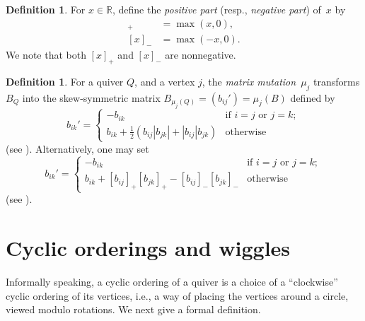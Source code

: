 \documentclass[11pt, letterpaper]{amsart}
\theoremstyle{definition}
\newtheorem{definition}[theorem]{Definition}
\numberwithin{equation}{section}
\def\RR{{\mathbb R}}
\begin{document}
\begin{definition}
For $x\in\RR$, define the \emph{positive part} (resp., \emph{negative part}) of~$x$ by 
\begin{align*}
[x]_+ &= \max(x,0), \\
[x]_- &= \max(-x,0). 
\end{align*}
We note that both $[x]_+$ and $[x]_-$ are nonnegative.  
\end{definition}

\begin{definition}
\label{def:matrix-mut}
For a quiver $Q$, and a vertex $j$, the \emph{matrix mutation}~$\mu_j$ transforms $B_Q$ into the skew-symmetric matrix $B_{\mu_j(Q)}=(b_{ij}')=\mu_j(B)$ defined by
\begin{equation}
b_{ik}'=\begin{cases}
-b_{ik} & \text{if $i=j$ or $j=k$}; \\
b_{ik}+\frac12 (b_{ij}|b_{jk}|+|b_{ij}|b_{jk}) & \text{otherwise}
\end{cases}
\end{equation}
(see \cite[(4.3)]{ca1}). 
Alternatively, one may set 
\begin{equation}
\label{eq: def mutation signs}
b_{ik}'=\begin{cases}
-b_{ik} & \text{if $i=j$ or $j=k$}; \\
b_{ik}+ [b_{ij}]_+[b_{jk}]_+ - [b_{ij}]_-[b_{jk}]_- & \text{otherwise}
\end{cases}
\end{equation}
(see \cite[(2.2)]{ca4}). 
\end{definition}







\newpage 


\section{Cyclic orderings and wiggles}
\label{sec:cyclic orderings}

Informally speaking, a cyclic ordering of a quiver is a choice of a ``clockwise'' cyclic ordering of
its vertices, i.e., a way of placing the vertices around a circle, 
viewed modulo rotations. 
We next give a formal definition. 
\end{document}
